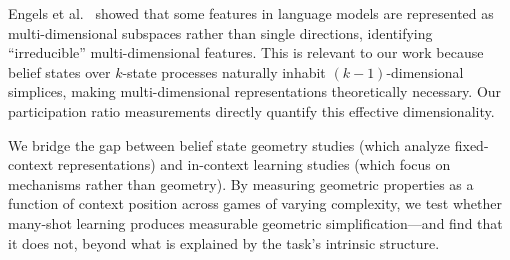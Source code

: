 Engels et al.~\cite{engels2024not} showed that some features in language models are represented as multi-dimensional subspaces rather than single directions, identifying ``irreducible'' multi-dimensional features. This is relevant to our work because belief states over $k$-state processes naturally inhabit $(k{-}1)$-dimensional simplices, making multi-dimensional representations theoretically necessary. Our participation ratio measurements directly quantify this effective dimensionality.

We bridge the gap between belief state geometry studies (which analyze fixed-context representations) and in-context learning studies (which focus on mechanisms rather than geometry). By measuring geometric properties as a function of context position across games of varying complexity, we test whether many-shot learning produces measurable geometric simplification---and find that it does not, beyond what is explained by the task's intrinsic structure.
